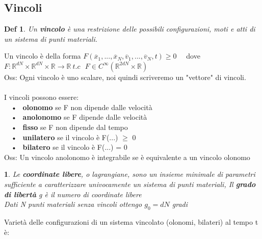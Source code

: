 \documentclass{article}
\theoremstyle{unnumbered}
\newtheorem* {theoremT}{Def}
\theoremstyle{unnumbered1}
\newtheorem* {theoremT1}{}
\newenvironment{defi}{\begin{gBox}\begin{theoremT}}{\end{theoremT}\end{gBox}}
\newenvironment{Ndefi}{\begin{gBox}\begin{theoremT1}}{\end{theoremT1}\end{gBox}}
\begin{document}
%
%
\subsection{Vincoli}
%
\begin{defi}
Un \textbf{vincolo} è una restrizione delle possibili configurazioni, moti e atti di un sistema di punti materiali.
\end{defi}
Un vincolo è della forma $F(\overline{x}_1, ..., \overline{x}_N, \overline{v}_1, ... , \overline{v}_N, t ) \geq 0$ \ \ dove $F:\mathbb{R}^{dN}\times\mathbb{R}^{dN}\times\mathbb{R}\rightarrow\mathbb{R} \ t.c \ \ \ F \in C^\infty(\mathbb{R}^{2dN}\times\mathbb{R})$\\
Oss: Ogni vincolo è uno scalare, noi quindi scriveremo un "vettore" di vincoli. \\ \\
%
%
%
I vincoli possono essere: \\
\ \ • \ \textbf{olonomo} se F non dipende dalle velocità \\
\ \ • \ \textbf{anolonomo} se F dipende dalle velocità \\
\ \ • \ \textbf{fisso} se F non dipende dal tempo\\
\ \ • \ \textbf{unilatero} se il vincolo è F(...) $\geq$ 0 \\
\ \ • \ \textbf{bilatero} se il vincolo è F(...) = 0 \\
Oss: Un vincolo anolonomo è integrabile se è equivalente a un vincolo olonomo \\
%
%
%
\begin{Ndefi}
Le \textbf{coordinate libere}, o lagrangiane, sono un insieme minimale di parametri sufficiente a caratterizzare univocamente un sistema di punti materiali, Il \textbf{grado di libertà} g è il numero di coordinate libere\\
Dati N punti materiali senza vincoli ottengo $g_0=dN$ gradi
\end{Ndefi}
%
%
%
Varietà delle configurazioni di un sistema vincolato (olonomi, bilateri) al tempo t è:
\end{document}
